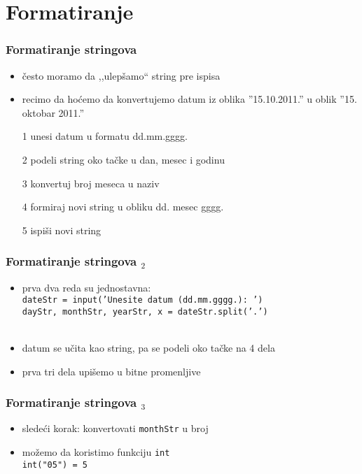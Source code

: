\documentclass[utf8,compress,aspectratio=169]{beamer}
\begin{document}
\section{Formatiranje}

\begin{frame}[fragile]
  \frametitle{Formatiranje stringova}
  \begin{itemize}
    \item često moramo da ,,ulepšamo`` string pre ispisa
    \item recimo da hoćemo da konvertujemo datum iz oblika ''15.10.2011.'' u oblik ''15. oktobar 2011.''
    \item[1] unesi datum u formatu dd.mm.gggg.
    \item[2] podeli string oko tačke u dan, mesec i godinu
    \item[3] konvertuj broj meseca u naziv
    \item[4] formiraj novi string u obliku dd. mesec gggg.
    \item[5] ispiši novi string
  \end{itemize}
\end{frame}

\begin{frame}[fragile]
  \frametitle{Formatiranje stringova $_2$}
  \begin{itemize}
    \item prva dva reda su jednostavna: \\
      \texttt{dateStr = input('Unesite datum (dd.mm.gggg.): ')} \\
      \texttt{dayStr, monthStr, yearStr, x = dateStr.split('.')} \\ \ \\ %
    \item datum se učita kao string, pa se podeli oko tačke na 4 dela
    \item prva tri dela upišemo u bitne promenljive
  \end{itemize}
\end{frame}

\begin{frame}[fragile]
  \frametitle{Formatiranje stringova $_3$}
  \begin{itemize}
    \item sledeći korak: konvertovati \texttt{monthStr} u broj
    \item možemo da koristimo funkciju \texttt{int} \\
      \texttt{int("05") = 5}
  \end{itemize}
\end{frame}
\end{document}
